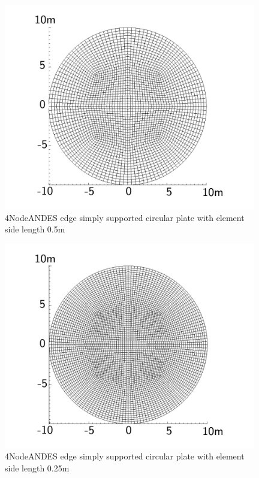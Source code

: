 \documentclass[fleqn,11pt]{article}
\begin{document}
\begin{figure}[H]
  \centering
  \includegraphics[width=11cm]{../Figure-files/circular_plate5.pdf}
  \caption{4NodeANDES edge simply supported circular plate with element side length 0.5m }
  \label{fig 4NodeANDES edges simply supported circular plate with element side length 0.5m }
\end{figure}

\newpage

\begin{figure}[H]
  \centering
  \includegraphics[width=11cm]{../Figure-files/circular_plate6.pdf}
  \caption{4NodeANDES edge simply supported circular plate with element side length 0.25m }
  \label{fig 4NodeANDES edges simply supported circular plate with element side length 0.25m }
\end{figure}
\end{document}
